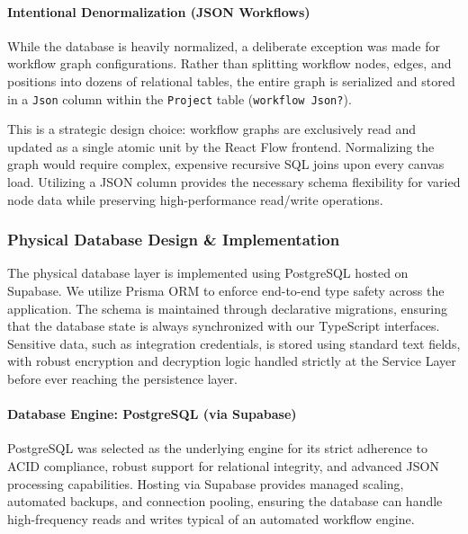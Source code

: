 \paragraph{Intentional Denormalization (JSON Workflows)}
While the database is heavily normalized, a deliberate exception was made for workflow graph configurations. Rather than splitting workflow nodes, edges, and positions into dozens of relational tables, the entire graph is serialized and stored in a \texttt{Json} column within the \texttt{Project} table (\texttt{workflow Json?}). 

This is a strategic design choice: workflow graphs are exclusively read and updated as a single atomic unit by the React Flow frontend. Normalizing the graph would require complex, expensive recursive SQL joins upon every canvas load. Utilizing a JSON column provides the necessary schema flexibility for varied node data while preserving high-performance read/write operations.

\subsubsection{Physical Database Design \& Implementation}

The physical database layer is implemented using PostgreSQL hosted on Supabase. We utilize Prisma ORM to enforce end-to-end type safety across the application. The schema is maintained through declarative migrations, ensuring that the database state is always synchronized with our TypeScript interfaces. Sensitive data, such as integration credentials, is stored using standard text fields, with robust encryption and decryption logic handled strictly at the Service Layer before ever reaching the persistence layer.

\paragraph{Database Engine: PostgreSQL (via Supabase)}
PostgreSQL was selected as the underlying engine for its strict adherence to ACID compliance, robust support for relational integrity, and advanced JSON processing capabilities. Hosting via Supabase provides managed scaling, automated backups, and connection pooling, ensuring the database can handle high-frequency reads and writes typical of an automated workflow engine.

